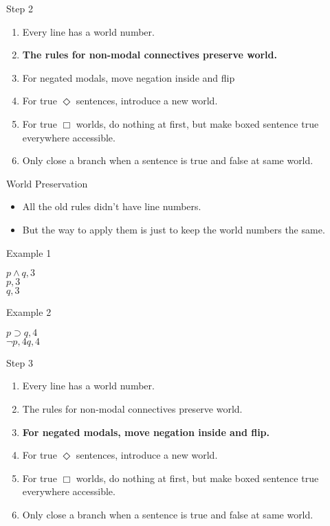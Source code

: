 \documentclass[
  14pt,
  letterpaper,
  ignorenonframetext,
  aspectratio=169,
]{beamer}
\providecommand{\tightlist}{%
  \setlength{\itemsep}{0pt}\setlength{\parskip}{0pt}}\usepackage{longtable,booktabs,array}
\begin{document}
\begin{frame}{Step 2}
\protect\hypertarget{step-2}{}
\begin{enumerate}
\tightlist
\item
  Every line has a world number.
\item
  \textbf{The rules for non-modal connectives preserve world.}
\item
  For negated modals, move negation inside and flip
\item
  For true \(\Diamond\) sentences, introduce a new world.
\item
  For true \(\Box\) worlds, do nothing at first, but make boxed sentence
  true everywhere accessible.
\item
  Only close a branch when a sentence is true and false at same world.
\end{enumerate}
\end{frame}

\begin{frame}{World Preservation}
\protect\hypertarget{world-preservation}{}
\begin{itemize}
\tightlist
\item
  All the old rules didn't have line numbers.
\item
  But the way to apply them is just to keep the world numbers the same.
\end{itemize}
\end{frame}

\begin{frame}{Example 1}
\protect\hypertarget{example-1}{}
\begin{center}
$p \wedge q, 3$ \\
$p, 3$ \\
$q, 3$ \\
\end{center}
\end{frame}

\begin{frame}{Example 2}
\protect\hypertarget{example-2}{}
\begin{center}
$p \supset q, 4$ \\
$\neg p, 4               q, 4$ \\
\end{center}
\end{frame}

\begin{frame}{Step 3}
\protect\hypertarget{step-3}{}
\begin{enumerate}
\tightlist
\item
  Every line has a world number.
\item
  The rules for non-modal connectives preserve world.
\item
  \textbf{For negated modals, move negation inside and flip.}
\item
  For true \(\Diamond\) sentences, introduce a new world.
\item
  For true \(\Box\) worlds, do nothing at first, but make boxed sentence
  true everywhere accessible.
\item
  Only close a branch when a sentence is true and false at same world.
\end{enumerate}
\end{frame}
\end{document}
